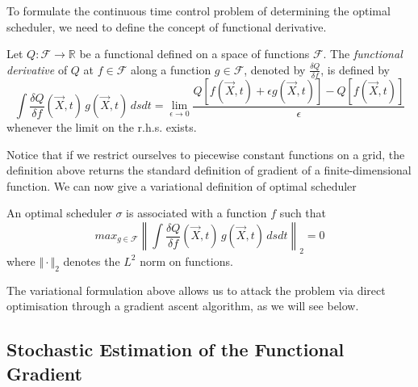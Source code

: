 To formulate the continuous time control problem of determining the optimal scheduler, we need to define the concept of functional derivative.

\begin{definition}
Let $Q\colon\mathcal{F}\rightarrow\mathbb{R}$ be a functional defined on a space of functions $\mathcal{F}$. 
The {\it functional derivative} of $Q$ at $f\in\mathcal{F}$ along a function $g\in\mathcal{F}$, denoted by $\frac{\delta Q}{\delta f}$, is defined by 
\begin{equation}
\int \frac{\delta Q}{\delta f}(\vec{X}, t) \, g(\vec{X}, t) \, ds dt = \lim_{\epsilon \rightarrow 0} \frac{Q[f(\vec{X}, t) + \epsilon g(\vec{X}, t)] - Q[f(\vec{X}, t)]}{\epsilon}
\label{eq:directionalDerivativeApprox}
\end{equation}
whenever the limit on the r.h.s. exists.  \end{definition}
Notice that if we restrict ourselves to piecewise constant functions on a grid, the definition above returns the standard definition of gradient of a finite-dimensional function.
We can now give a variational definition of optimal scheduler
\begin{lemma}
An optimal scheduler $\sigma$ is associated with a function $f$ such that 
\begin{equation}
max_{g\in\mathcal{F}} \left\| \int \frac{\delta Q}{\delta f}(\vec{X}, t) \, g(\vec{X}, t) \, ds dt \right\|_2=0\label{varFormulation}
\end{equation}
where $\Vert\cdot\Vert_2$ denotes the $L^2$ norm on functions.
\end{lemma}
The variational formulation above allows us to attack the problem via direct optimisation through a gradient ascent algorithm, as we will see below.





















\subsection{Stochastic Estimation of the Functional Gradient}

